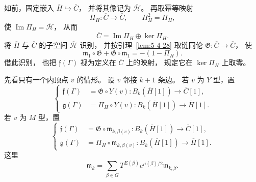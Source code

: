 如前，固定嵌入
$\overline H\hookrightarrow\overline C$，
并将其像记为
$\overline{\mathcal H}$。
再取幂等映射
\[
\Pi_H:\overline C\longrightarrow\overline C,
\qquad
\Pi_H^2=\Pi_H,
\]
使
$\operatorname{Im}\Pi_H
=\overline{\mathcal H}$，
从而
\[
\overline C
=\operatorname{Im}\Pi_H
\oplus\ker\Pi_H.
\]
将 $\overline H$ 与
$\overline C$ 的子空间
$\overline{\mathcal H}$ 识别，
并按引理~\ref{lem:5-4-28}
取链同伦
$\mathfrak G:\overline C\to\overline C$，
使
\[
\overline{\mathfrak m}_1\circ\mathfrak G
+\mathfrak G\circ\overline{\mathfrak m}_1
=-(1-\Pi_H).
\]
借此识别，
也把 $\mathfrak f(\Gamma)$
视为定义在 $\overline C$ 上的映射，
规定它在 $\ker\Pi_H$ 上取零。

先看只有一个内顶点 $v$ 的情形。
设 $v$ 邻接 $k+1$ 条边。
若 $v$ 为 $Y$ 型，置
\begin{equation}
\left\{
\begin{aligned}
\mathfrak f(\Gamma)
&=\mathfrak G\circ Y(v):
B_k(\overline H[1])
\longrightarrow\overline C[1],\\
\mathfrak g(\Gamma)
&=\Pi_H\circ Y(v):
B_k(\overline H[1])
\longrightarrow\overline H[1].
\end{aligned}
\right.
\tag{7.4.49.1}\label{eq:7-4-49-1}
\end{equation}
若 $v$ 为 $M$ 型，置
\begin{equation}
\left\{
\begin{aligned}
\mathfrak f(\Gamma)
&=\mathfrak G\circ
\mathfrak m_{k,\beta(v)}:
B_k(\overline H[1])
\longrightarrow\overline C[1],\\
\mathfrak g(\Gamma)
&=\Pi_H\circ
\mathfrak m_{k,\beta(v)}:
B_k(\overline H[1])
\longrightarrow\overline H[1].
\end{aligned}
\right.
\tag{7.4.49.2}\label{eq:7-4-49-2}
\end{equation}
这里
\[
\mathfrak m_k
=\sum_{\beta\in G}
T^{E(\beta)}e^{\mu(\beta)/2}
\mathfrak m_{k,\beta}.
\]

